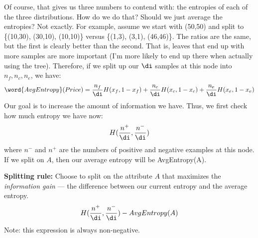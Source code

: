 Of course, that gives us three numbers to contend with: the entropies
of each of the three distributions.  How do we do that? Should we just
average the entropies?  Not exactly.  For example, assume we start with
(50,50) and split to \{(10,30), (30,10), (10,10)\} versus \{(1,3), (3,1), 
(46,46)\}.  The ratios are the same, but the first is clearly 
better than the second.  That is, leaves that end up with more samples are
more important (I'm more likely to end up there when actually using the
tree).  Therefore, if we split up our $\di$ samples at this node into
$n_f,n_c,n_e$, we have: 
\[
 \word{AvgEntropy}(Price) = \frac{n_f}{\di} H(x_f,1-x_f) +
  \frac{n_c}{\di} H(x_c,1-x_c) + \frac{n_e}{\di} H(x_e,1-x_e)
\]
Our goal is to increase the amount of information we have.  Thus, we
first check how much entropy we have now:
\[
 H(\frac{n^+}{\di}, \frac{n^-}{\di})
\]
where $n^-$ and $n^+$ are the numbers of positive and negative
examples at this node.  If we split on $A$, then our average entropy
will be AvgEntropy(A).  

{\bf Splitting rule:}  Choose to split on the attribute $A$ that
maximizes the {\em information gain\/} --- the difference between our current
entropy and the average entropy.
\[
 H(\frac{n^+}{\di}, \frac{n^-}{\di}) - AvgEntropy(A)
\]
Note: this expression is always non-negative.

